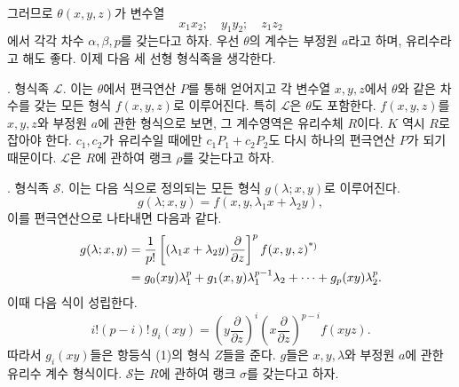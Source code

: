 그러므로 $\theta(x,y,z)$가 변수열
\[
  x_1x_2;\quad y_1y_2;\quad z_1z_2
\]
에서 각각 차수 $\alpha,\beta,p$를 갖는다고 하자. 우선 $\theta$의 계수는 부정원 $a$라고 하며, 유리수라고 해도 좋다. 이제 다음 세 선형 형식족을 생각한다.

. 형식족 $\mathcal L$. 이는 $\theta$에서 편극연산 $P$를 통해 얻어지고 각 변수열 $x,y,z$에서 $\theta$와 같은 차수를 갖는 모든 형식 $f(x,y,z)$로 이루어진다. 특히 $\mathcal L$은 $\theta$도 포함한다. $f(x,y,z)$를 $x,y,z$와 부정원 $a$에 관한 형식으로 보면, 그 계수영역은 유리수체 $R$이다. $K$ 역시 $R$로 잡아야 한다. $c_1,c_2$가 유리수일 때에만 $c_1P_1+c_2P_2$도 다시 하나의 편극연산 $P$가 되기 때문이다. $\mathcal L$은 $R$에 관하여 랭크 $\rho$를 갖는다고 하자.

. 형식족 $\mathcal S$. 이는 다음 식으로 정의되는 모든 형식 $g(\lambda;x,y)$로 이루어진다.
\[
  g(\lambda;x,y)=f(x,y,\lambda_1x+\lambda_2y),
\]
이를 편극연산으로 나타내면 다음과 같다.
\[
\begin{aligned}
  g(\lambda;x,y)
  &=\frac1{p!}\left[(\lambda_1x+\lambda_2y)\frac{\partial}{\partial z}\right]^p f(x,y,z)\srcfnmark{*)} \\
  &=g_0(xy)\lambda_1^p+g_1(x,y)\lambda_1^{p-1}\lambda_2+\cdots+g_p(xy)\lambda_2^p.
\end{aligned}
\]
이때 다음 식이 성립한다.
\[
  i!(p-i)!\,g_i(xy)=
  \left(y\frac{\partial}{\partial z}\right)^i
  \left(x\frac{\partial}{\partial z}\right)^{p-i}f(xyz).
\]
따라서 $g_i(xy)$들은 항등식 (1)의 형식 $Z$들을 준다. $g$들은 $x,y,\lambda$와 부정원 $a$에 관한 유리수 계수 형식이다. $\mathcal S$는 $R$에 관하여 랭크 $\sigma$를 갖는다고 하자.

